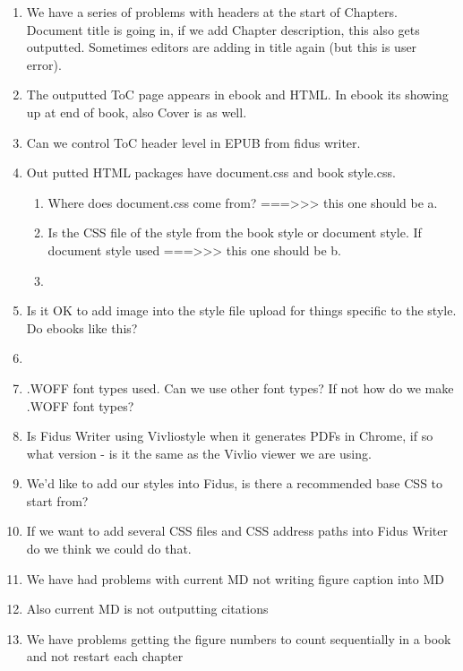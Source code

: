 \documentclass{article}
\begin{document}
\begin{enumerate}
\item We have a series of problems with headers at the start of Chapters. Document title is going in, if we add Chapter description, this also gets outputted. Sometimes editors are adding in title again (but this is user error). 


\item The outputted ToC page appears in ebook and HTML. In ebook its showing up at end of book, also Cover is as well.


\item Can we control ToC header level in EPUB from fidus writer.


\item Out putted HTML packages have document.css and book style.css.

\begin{enumerate}
\item Where does document.css come from? ===>>> this one should be a.


\item Is the CSS file of the style from the book style or document style. If document style used  ===>>> this one should be b.


\item 


\end{enumerate}

\item Is it OK to add image into the style file upload for things specific to the style. Do ebooks like this?


\item 


\item .WOFF font types used. Can we use other font types? If not how do we make .WOFF font types?


\item Is Fidus Writer using Vivliostyle when it generates PDFs in Chrome, if so what version - is it the same as the Vivlio viewer we are using.


\item We’d like to add our styles into Fidus, is there a recommended base CSS to start from?


\item If we want to add several CSS files and CSS address paths into Fidus Writer do we think we could do that.


\item We have had problems with current MD not writing figure caption into MD


\item Also current MD is not outputting citations


\item We have problems getting the figure numbers to count sequentially in a book and not restart each chapter


\end{enumerate}
\end{document}
